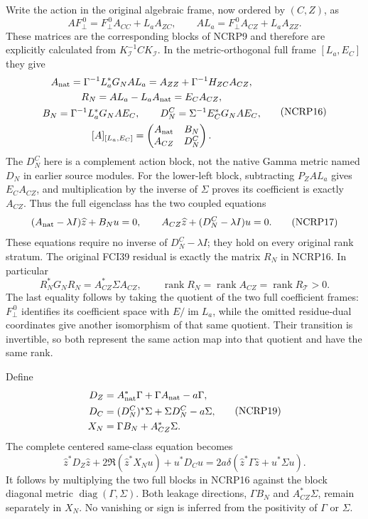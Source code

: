 \documentclass[11pt,a4paper]{article}
\begin{document}
Write the action in the original algebraic frame, now ordered by
$(C,Z)$, as
\[
 A F_\perp^{\,0}=F_\perp^{\,0}A_{CC}+L_aA_{ZC},\qquad
 A L_a=F_\perp^{\,0}A_{CZ}+L_aA_{ZZ}.
 \tag{NCRP15}
\]
These matrices are the corresponding blocks of NCRP9 and therefore
are explicitly calculated from $K_{\mathcal I}^{-1}CK_{\mathcal I}$.
In the metric-orthogonal full frame $[L_a,E_C]$ they give
\[
 \begin{gathered}
 A_{\rm nat}=\Gamma^{-1}L_a^*G_NAL_a
              =A_{ZZ}+\Gamma^{-1}H_{ZC}A_{CZ},\\
 R_N=AL_a-L_aA_{\rm nat}=E_CA_{CZ},\\
 B_N=\Gamma^{-1}L_a^*G_NAE_C,\qquad
 D_N^{C}=\Sigma^{-1}E_C^*G_NAE_C,\\
 [A]_{[L_a,E_C]}
       =\begin{pmatrix}A_{\rm nat}&B_N\\ A_{CZ}&D_N^{C}\end{pmatrix}.
 \end{gathered}                                                   \tag{NCRP16}
\]
The $D_N^{C}$ here is a complement action block, not the native
Gamma metric named $D_N$ in earlier source modules.
For the lower-left block, subtracting $P_ZAL_a$ gives
$E_CA_{CZ}$, and multiplication by the inverse of $\Sigma$
proves its coefficient is exactly $A_{CZ}$.
Thus the full eigenclass has the two coupled equations
\[
 (A_{\rm nat}-\lambda I)\widehat z+B_Nu=0,\qquad
 A_{CZ}\widehat z+(D_N^{C}-\lambda I)u=0 .
 \tag{NCRP17}
\]
These equations require no inverse of $D_N^C-\lambda I$;
they hold on every original rank stratum.
The original FCI39 residual is exactly the matrix $R_N$ in
NCRP16. In particular
\[
 R_N^*G_NR_N=A_{CZ}^*\Sigma A_{CZ},\qquad
 \operatorname{rank}R_N=\operatorname{rank}A_{CZ}
                         =\operatorname{rank}R_{\mathcal T}>0 .
 \tag{NCRP18}
\]
The last equality follows by taking the quotient of the two full
coefficient frames: $F_\perp^{\,0}$ identifies its coefficient space
with $E/\operatorname{im}L_a$, while the omitted residue-dual
coordinates give another isomorphism of that same quotient.
Their transition is invertible, so both represent the same action
map into that quotient and have the same rank.

Define
\[
 \begin{split}
 D_Z&=A_{\rm nat}^*\Gamma+\Gamma A_{\rm nat}-a\Gamma,\\
 D_C&=(D_N^{C})^*\Sigma+\Sigma D_N^{C}-a\Sigma,\\
 X_N&=\Gamma B_N+A_{CZ}^*\Sigma.
 \end{split}                                                     \tag{NCRP19}
\]
The complete centered same-class equation becomes
\[
 \boxed{\quad
 \widehat z^*D_Z\widehat z+
    2\Re(\widehat z^*X_Nu)+u^*D_Cu
 =2a\delta(\widehat z^*\Gamma\widehat z+u^*\Sigma u).
 \quad}                                                         \tag{NCRP20}
\]
It follows by multiplying the two full blocks in NCRP16 against
the block diagonal metric $\operatorname{diag}(\Gamma,\Sigma)$.
Both leakage directions, $\Gamma B_N$ and $A_{CZ}^*\Sigma$,
remain separately in $X_N$. No vanishing or sign is inferred from
the positivity of $\Gamma$ or $\Sigma$.
\end{document}
